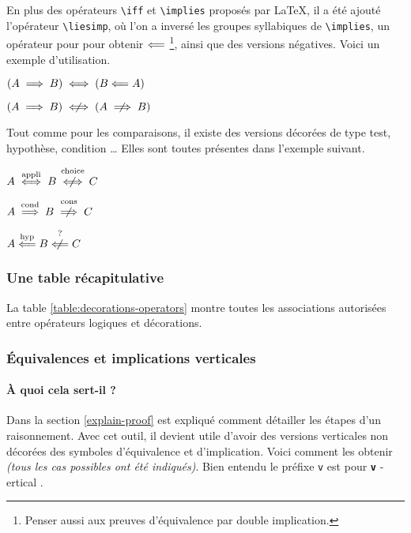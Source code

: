 \documentclass[12pt,a4paper]{article}
\makeatletter
\newcommand\env[1]{\texttt{#1}}
\newcommand\macro[1]{\env{\textbackslash{}#1}}
\theoremstyle{definition}
\newcommand\whyprefix[2]{%
	\textbf{\prefix{#1}}-#2%
}
\newcommand\prefix[1]{%
	\texttt{#1}%
}
\newcounter{paraexample}[subsubsection]
\newcommand\@newexample@abstract[2]{%
	\paragraph{%
		#1%
		\if\relax\detokenize{#2}\relax\else {} -- #2\fi%
	}%
}
\newcommand\newparaexample{\@ifstar{\@newparaexample@star}{\@newparaexample@no@star}}
\newcommand\@newparaexample@no@star[1]{%
	\refstepcounter{paraexample}%
	\@newexample@abstract{Exemple \theparaexample}{#1}%
}
\newcommand\@newparaexample@star[1]{%
	\@newexample@abstract{Exemple}{#1}%
}
\makeatother
\begin{document}
En plus des opérateurs \macro{iff} et \macro{implies} proposés par \LaTeX{}, il a été ajouté l'opérateur \macro{liesimp}, où l'on a inversé les groupes syllabiques de \macro{implies}, un opérateur pour pour obtenir $\mathrel{\Longleftarrow}$
\footnote{
	Penser aussi aux preuves d'équivalence par double implication.
},
ainsi que des versions négatives. Voici un exemple d'utilisation.

\begin{latexex}
$(A \implies B)
 \iff (B \mathrel{\Longleftarrow} A)$

$(A \implies B)
 \niff (A \nimplies B)$
\end{latexex}




\newparaexample{Des opérateurs décorés}

Tout comme pour les comparaisons, il existe des versions décorées de type test, hypothèse, condition \dots{} 
Elles sont toutes présentes dans l'exemple suivant.

\begin{latexex}
$A \iffappli B \niffchoice C$

$A \impliescond B \nimpliescons C$

$A \liesimphyp B \nliesimptest C$
\end{latexex}


\subsubsection{Une table récapitulative}

La table \ref{table:decorations-operators}  montre toutes les associations autorisées entre opérateurs logiques et décorations.




\subsubsection{Équivalences et implications verticales}

\paragraph{À quoi cela sert-il ?}

Dans la section \ref{explain-proof} est expliqué comment détailler les étapes d'un raisonnement. Avec cet outil, il devient utile d'avoir des versions verticales non décorées des symboles d'équivalence et d'implication. Voici comment les obtenir \emph{(tous les cas possibles ont été indiqués)}.
Bien entendu le préfixe \prefix{v} est pour \whyprefix{v}{ertical}.
\end{document}
